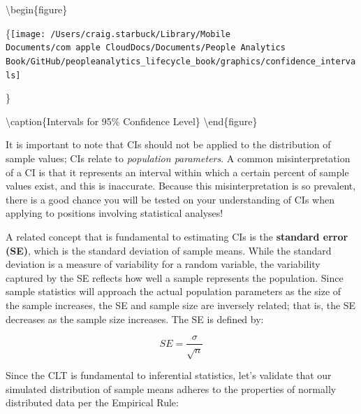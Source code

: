\documentclass[]{book}
\newenvironment{Shaded}{\begin{snugshade}}{\end{snugshade}}
\newcommand{\CommentTok}[1]{\textcolor[rgb]{0.56,0.35,0.01}{\textit{#1}}}
\newcommand{\DecValTok}[1]{\textcolor[rgb]{0.00,0.00,0.81}{#1}}
\newcommand{\KeywordTok}[1]{\textcolor[rgb]{0.13,0.29,0.53}{\textbf{#1}}}
\newcommand{\NormalTok}[1]{#1}
\newcommand{\OperatorTok}[1]{\textcolor[rgb]{0.81,0.36,0.00}{\textbf{#1}}}
\newcommand{\StringTok}[1]{\textcolor[rgb]{0.31,0.60,0.02}{#1}}
\begin{document}
\textbackslash{}begin\{figure\}

\{\centering \texttt{[image: /Users/craig.starbuck/Library/Mobile Documents/com~apple~CloudDocs/Documents/People Analytics Book/GitHub/peopleanalytics\_lifecycle\_book/graphics/confidence\_intervals]}

\}

\textbackslash{}caption\{Intervals for 95\% Confidence Level\}\label{fig:cis}
\textbackslash{}end\{figure\}

It is important to note that CIs should not be applied to the distribution of sample values; CIs relate to \emph{population parameters}. A common misinterpretation of a CI is that it represents an interval within which a certain percent of sample values exist, and this is inaccurate. Because this misinterpretation is so prevalent, there is a good chance you will be tested on your understanding of CIs when applying to positions involving statistical analyses!

A related concept that is fundamental to estimating CIs is the \textbf{standard error (SE)}, which is the standard deviation of sample means. While the standard deviation is a measure of variability for a random variable, the variability captured by the SE reflects how well a sample represents the population. Since sample statistics will approach the actual population parameters as the size of the sample increases, the SE and sample size are inversely related; that is, the SE decreases as the sample size increases. The SE is defined by:

\[ SE = \frac{\sigma}{\sqrt{n}} \]

Since the CLT is fundamental to inferential statistics, let's validate that our simulated distribution of sample means adheres to the properties of normally distributed data per the Empirical Rule:

\begin{Shaded}
\end{Shaded}
\end{document}
